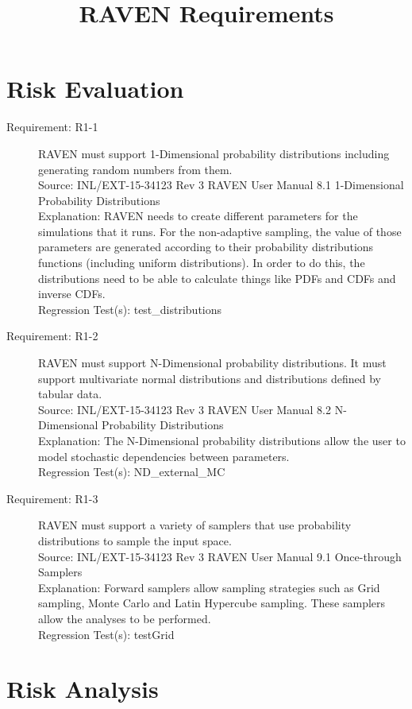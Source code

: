 \documentclass{article}
\title{RAVEN Requirements}
\newcommand{\requirement}[5]{\item[Requirement: #1] #2 \\Source: #3\\Explanation: #4\\Regression Test(s): #5}
\begin{document}
\maketitle

\section{Risk Evaluation}

\begin{description}

\requirement{R1-1}{RAVEN must support 1-Dimensional probability distributions including generating random numbers from them.}
{INL/EXT-15-34123 Rev 3 RAVEN User Manual 8.1 1-Dimensional Probability Distributions}
{RAVEN needs to create different parameters for the simulations that it runs.  For the non-adaptive sampling, the value of those parameters are generated according to their probability distributions functions (including uniform distributions).  In order to do this, the distributions need to be able to calculate things like PDFs and CDFs and inverse CDFs.}
{test\_distributions}

\requirement{R1-2}{RAVEN must support N-Dimensional probability distributions.  It must support multivariate normal distributions and distributions defined by tabular data.}
{INL/EXT-15-34123 Rev 3 RAVEN User Manual 8.2 N-Dimensional Probability Distributions}
{The N-Dimensional probability distributions allow the user to model stochastic dependencies between parameters.}
{ND\_external\_MC}

\requirement{R1-3}{RAVEN must support a variety of samplers that use probability distributions to sample the input space.}
{INL/EXT-15-34123 Rev 3 RAVEN User Manual 9.1 Once-through Samplers}
{Forward samplers allow sampling strategies such as Grid sampling, Monte Carlo and Latin Hypercube sampling.  These samplers allow the analyses to be performed.}
{testGrid}

\end{description}

\section{Risk Analysis}
\end{document}
